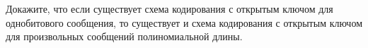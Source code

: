 Докажите, что если существует схема кодирования с открытым ключом для однобитового сообщения, то
существует и схема кодирования с открытым ключом для произвольных сообщений полиномиальной длины.

